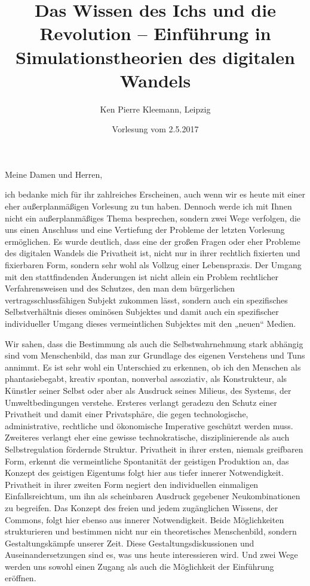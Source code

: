 \documentclass[a4paper,11pt]{article}
\title{Das Wissen des Ichs und die Revolution – Einführung in
  Simulationstheorien des digitalen Wandels }
\author{Ken Pierre Kleemann, Leipzig}
\date{Vorlesung vom 2.5.2017}
\begin{document}
\maketitle

Meine Damen und Herren,

ich bedanke mich für ihr zahlreiches Erscheinen, auch wenn wir es heute mit
einer eher außerplanmäßigen Vorlesung zu tun haben. Dennoch werde ich mit
Ihnen nicht ein außerplanmäßiges Thema besprechen, sondern zwei Wege
verfolgen, die uns einen Anschluss und eine Vertiefung der Probleme der
letzten Vorlesung ermöglichen. Es wurde deutlich, dass eine der großen Fragen
oder eher Probleme des digitalen Wandels die Privatheit ist, nicht nur in
ihrer rechtlich fixierten und fixierbaren Form, sondern sehr wohl als Vollzug
einer Lebenspraxis. Der Umgang mit den stattfindenden Änderungen ist nicht
allein ein Problem rechtlicher Verfahrensweisen und des Schutzes, den man dem
bürgerlichen vertragsschlussfähigen Subjekt zukommen lässt, sondern auch ein
spezifisches Selbstverhältnis dieses ominösen Subjektes und damit auch ein
spezifischer individueller Umgang dieses vermeintlichen Subjektes mit den
„neuen“ Medien.

Wir sahen, dass die Bestimmung als auch die Selbstwahrnehmung stark abhängig
sind vom Menschenbild, das man zur Grundlage des eigenen Verstehens und Tuns
annimmt. Es ist sehr wohl ein Unterschied zu erkennen, ob ich den Menschen als
phantasiebegabt, kreativ spontan, nonverbal assoziativ, als Konstrukteur, als
Künstler seiner Selbst oder aber als Ausdruck seines Milieus, des Systems, der
Umweltbedingungen verstehe. Ersteres verlangt geradezu den Schutz einer
Privatheit und damit einer Privatsphäre, die gegen technologische,
administrative, rechtliche und ökonomische Imperative geschützt werden muss.
Zweiteres verlangt eher eine gewisse technokratische, disziplinierende als
auch Selbstregulation fördernde Struktur. Privatheit in ihrer ersten, niemals
greifbaren Form, erkennt die vermeintliche Spontanität der geistigen
Produktion an, das Konzept des geistigen Eigentums folgt hier aus tiefer
innerer Notwendigkeit. Privatheit in ihrer zweiten Form negiert den
individuellen einmaligen Einfallsreichtum, um ihn als scheinbaren Ausdruck
gegebener Neukombinationen zu begreifen. Das Konzept des freien und jedem
zugänglichen Wissens, der Commons, folgt hier ebenso aus innerer
Notwendigkeit. Beide Möglichkeiten strukturieren und bestimmen nicht nur ein
theoretisches Menschenbild, sondern Gestaltungskämpfe unserer Zeit. Diese
Gestaltungsdiskussionen und Auseinandersetzungen sind es, was uns heute
interessieren wird. Und zwei Wege werden uns sowohl einen Zugang als auch die
Möglichkeit der Einführung eröffnen.
\end{document}

